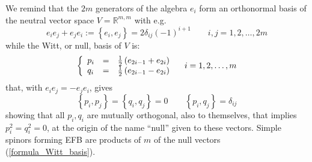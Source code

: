 \documentclass[a4paper,twoside,11pt]{article}
\begin{document}
We remind that the $2m$ generators of the algebra ${e}_{i}$ form an orthonormal basis of the neutral vector space $V = {\ensuremath{\mathbb{R}}}^{m,m}$ with {e.g.\ }
\begin{equation}
\label{formula_generators}
{e}_i {e}_j + {e}_j {e}_i := {\ensuremath{\left\{ {{e}_i}, {{e}_j} \right\}}} = 2 \delta_{i j} (-1)^{i+1} \qquad i,j = 1,2, \ldots, 2 m
\end{equation}
while the Witt, or null, basis of $V$ is:
\begin{equation}
\label{formula_Witt_basis}
\left\{ \begin{array}{l l l}
p_{i} & = & \frac{1}{2} \left( {e}_{2i-1} + {e}_{2i} \right) \\
q_{i} & = & \frac{1}{2} \left( {e}_{2i-1} - {e}_{2i} \right)
\end{array} \right.
\quad i = 1,2, \ldots, m
\end{equation}
that, with ${e}_{i} {e}_{j} = - {e}_{j} {e}_{i}$, gives
\begin{equation}
\label{formula_Witt_basis_properties}
{\ensuremath{\left\{ {p_{i}}, {p_{j}} \right\}}} = {\ensuremath{\left\{ {q_{i}}, {q_{j}} \right\}}} = 0
\qquad
{\ensuremath{\left\{ {p_{i}}, {q_{j}} \right\}}} = \delta_{i j}
\end{equation}
showing that all $p_i, q_i$ are mutually orthogonal, also to themselves, that implies $p_i^2 = q_i^2 = 0$, at the origin of the name ``null'' given to these vectors. Simple spinors forming EFB are products of $m$ of the null vectors (\ref{formula_Witt_basis}).
\end{document}
